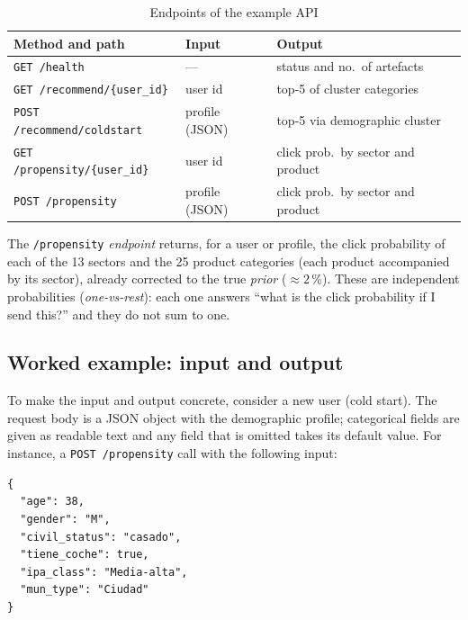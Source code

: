 \begin{table}[htbp]
\centering
\caption{Endpoints of the example API}
\label{tab:api}
\small
\begin{tabular}{lll}
\toprule
\textbf{Method and path} & \textbf{Input} & \textbf{Output} \\
\midrule
\texttt{GET /health}                 & ---            & status and no.\ of artefacts \\
\texttt{GET /recommend/\{user\_id\}}  & user id        & top-5 of cluster categories \\
\texttt{POST /recommend/coldstart}    & profile (JSON) & top-5 via demographic cluster \\
\texttt{GET /propensity/\{user\_id\}} & user id        & click prob.\ by sector and product \\
\texttt{POST /propensity}             & profile (JSON) & click prob.\ by sector and product \\
\bottomrule
\end{tabular}
\end{table}

The \texttt{/propensity} \textit{endpoint} returns, for a user or profile, the click probability of each of the 13 sectors and the 25 product categories (each product accompanied by its sector), already corrected to the true \textit{prior} ($\approx 2$\,\%). These are independent probabilities (\textit{one-vs-rest}): each one answers ``what is the click probability if I send this?'' and they do not sum to one.

\subsection{Worked example: input and output}

To make the input and output concrete, consider a new user (cold start). The request body is a JSON object with the demographic profile; categorical fields are given as readable text and any field that is omitted takes its default value. For instance, a \texttt{POST /propensity} call with the following input:

\begin{lstlisting}[language={},numbers=none,basicstyle=\ttfamily\footnotesize,caption={Request --- \texttt{POST /propensity} (input profile)},captionpos=b]
{
  "age": 38,
  "gender": "M",
  "civil_status": "casado",
  "tiene_coche": true,
  "ipa_class": "Media-alta",
  "mun_type": "Ciudad"
}
\end{lstlisting}

